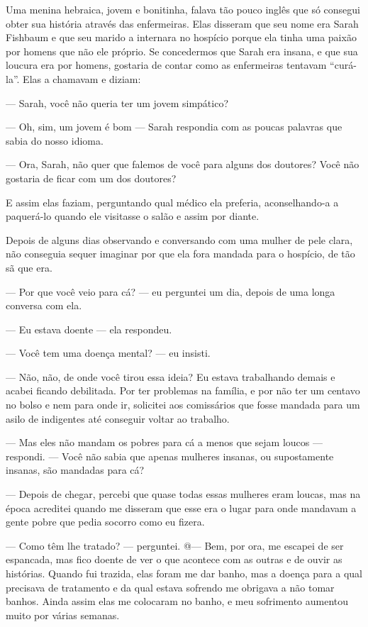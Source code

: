Uma menina hebraica, jovem e bonitinha, falava tão pouco inglês que só
consegui obter sua história através das enfermeiras. Elas disseram que
seu nome era Sarah Fishbaum e que seu marido a internara no hospício
porque ela tinha uma paixão por homens que não ele próprio. Se
concedermos que Sarah era insana, e que sua loucura era por homens,
gostaria de contar como as enfermeiras tentavam ``curá-la''. Elas a
chamavam e diziam:

--- Sarah, você não queria ter um jovem simpático?

--- Oh, sim, um jovem é bom --- Sarah respondia com as poucas palavras
que sabia do nosso idioma.

--- Ora, Sarah, não quer que falemos de você para alguns dos doutores?
Você não gostaria de ficar com um dos doutores?

E assim elas faziam, perguntando qual médico ela preferia,
aconselhando-a a paquerá-lo quando ele visitasse o salão e assim por
diante.

Depois de alguns dias observando e conversando com uma mulher de pele
clara, não conseguia sequer imaginar por que ela fora mandada para o
hospício, de tão sã que era.

--- Por que você veio para cá? --- eu perguntei um dia, depois de uma
longa conversa com ela.

--- Eu estava doente --- ela respondeu.

--- Você tem uma doença mental? --- eu insisti.

--- Não, não, de onde você tirou essa ideia? Eu estava trabalhando
demais e acabei ficando debilitada. Por ter problemas na família, e por
não ter um centavo no bolso e nem para onde ir, solicitei aos
comissários que fosse mandada para um asilo de indigentes até conseguir
voltar ao trabalho.

--- Mas eles não mandam os pobres para cá a menos que sejam loucos ---
respondi. --- Você não sabia que apenas mulheres insanas, ou
supostamente insanas, são mandadas para cá?

--- Depois de chegar, percebi que quase todas essas mulheres eram
loucas, mas na época acreditei quando me disseram que esse era o lugar
para onde mandavam a gente pobre que pedia socorro como eu fizera.

--- Como têm lhe tratado? --- perguntei. @--- Bem, por ora, me escapei
de ser espancada, mas fico doente de ver o que acontece com as outras e
de ouvir as histórias. Quando fui trazida, elas foram me dar banho, mas
a doença para a qual precisava de tratamento e da qual estava sofrendo
me obrigava a não tomar banhos. Ainda assim elas me colocaram no banho,
e meu sofrimento aumentou muito por várias semanas.

